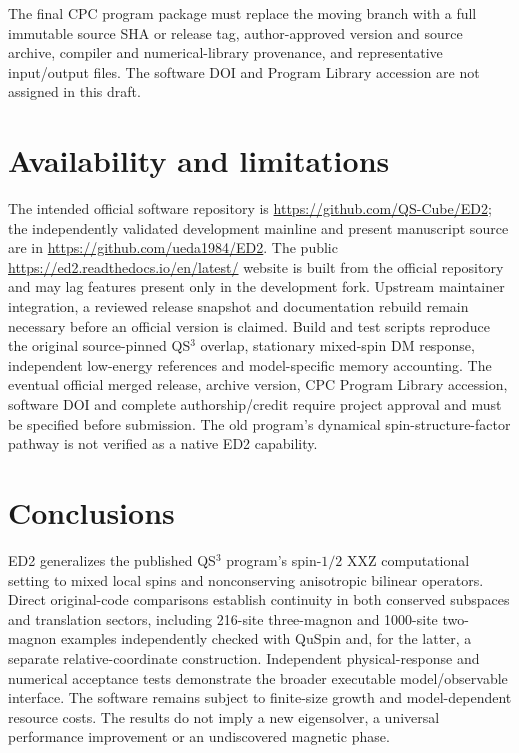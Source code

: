 \documentclass[preprint,12pt,nopreprintline]{elsarticle}
\begin{document}
The final CPC program package must replace the moving
branch with a full immutable source SHA or release tag,
author-approved version and source archive, compiler
and numerical-library provenance, and representative
input/output files. The software DOI and Program Library
accession are not assigned in this draft.

\section{Availability and limitations}
The intended official software repository is
\url{https://github.com/QS-Cube/ED2}; the independently
validated development mainline and present manuscript source
are in \url{https://github.com/ueda1984/ED2}.
The public \url{https://ed2.readthedocs.io/en/latest/}
website is built from the official repository and may lag
features present only in the development fork.
Upstream maintainer integration, a reviewed release snapshot
and documentation rebuild remain necessary before an
official version is claimed.
Build and test scripts reproduce the original
source-pinned QS$^3$ overlap, stationary mixed-spin
DM response, independent low-energy references
and model-specific memory accounting.
The eventual official merged release, archive version,
CPC Program Library accession, software DOI and complete
authorship/credit require project approval and
must be specified before submission.
The old program's dynamical spin-structure-factor pathway
is not verified as a native ED2 capability.

\section{Conclusions}
ED2 generalizes the published QS$^3$ program's
spin-$1/2$ XXZ computational setting to mixed local
spins and nonconserving anisotropic bilinear operators.
Direct original-code comparisons establish continuity
in both conserved subspaces and translation sectors,
including 216-site three-magnon and 1000-site two-magnon
examples independently checked with QuSpin and, for the
latter, a separate relative-coordinate construction.
Independent physical-response and numerical
acceptance tests demonstrate the broader executable
model/observable interface. The software remains
subject to finite-size growth and model-dependent
resource costs. The results do not imply a new
eigensolver, a universal performance improvement
or an undiscovered magnetic phase.

\appendix
\end{document}
